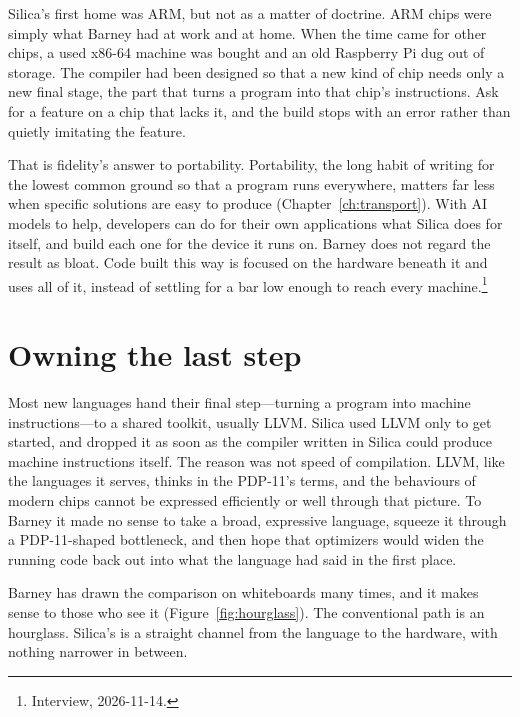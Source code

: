 Silica's first home was ARM, but not as a matter of doctrine. ARM chips were
simply what Barney had at work and at home. When the time came for other chips,
a used x86-64 machine was bought and an old Raspberry Pi dug out of storage.
The compiler had been designed so that a new kind of chip needs only a new final
stage, the part that turns a program into that chip's instructions. Ask for a
feature on a chip that lacks it, and the build stops with an error rather than
quietly imitating the feature.

That is fidelity's answer to portability. Portability, the long habit of writing
for the lowest common ground so that a program runs everywhere, matters far less
when specific solutions are easy to produce (Chapter~\ref{ch:transport}). With
AI models to help, developers can do for their own applications what Silica does
for itself, and build each one for the device it runs on. Barney does not regard
the result as bloat. Code built this way is focused on the hardware beneath it
and uses all of it, instead of settling for a bar low enough to reach every
machine.\footnote{Interview, 2026-11-14.}


\section{Owning the last step}

Most new languages hand their final step---turning a program into machine
instructions---to a shared toolkit, usually LLVM. Silica used LLVM only to get
started, and dropped it as soon as the compiler written in Silica could produce
machine instructions itself. The reason was not speed of compilation. LLVM, like
the languages it serves, thinks in the PDP-11's terms, and the behaviours of
modern chips cannot be expressed efficiently or well through that picture. To
Barney it made no sense to take a broad, expressive language, squeeze it through
a PDP-11-shaped bottleneck, and then hope that optimizers would widen the
running code back out into what the language had said in the first place.

Barney has drawn the comparison on whiteboards many times, and it makes sense to
those who see it (Figure~\ref{fig:hourglass}). The conventional path is an
hourglass. Silica's is a straight channel from the language to the hardware,
with nothing narrower in between.

